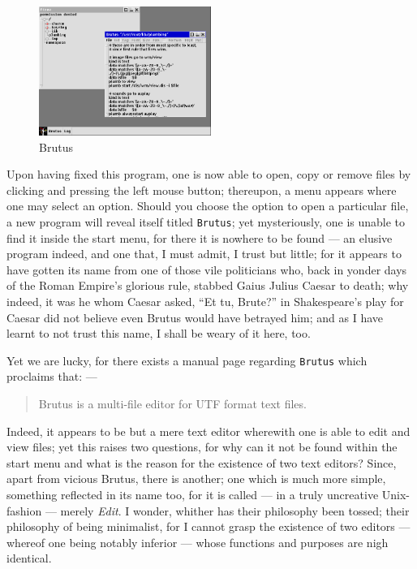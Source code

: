 \documentclass[a5paper,twoside,12pt]{report}
\begin{document}
  \begin{figure}
    \centering
    \includegraphics[width=0.5\textwidth]{imgs/brutus.png}
    \caption{Brutus}
  \end{figure}

  Upon having fixed this program, one is now able to open, copy or remove files by clicking and pressing the left mouse button; thereupon, a menu appears where one may select an option. Should you choose the option to open a particular file, a new program will reveal itself titled \texttt{Brutus}; yet mysteriously, one is unable to find it inside the start menu, for there it is nowhere to be found — an elusive program indeed, and one that, I must admit, I trust but little; for it appears to have gotten its name from one of those vile politicians who, back in yonder days of the Roman Empire's glorious rule, stabbed Gaius Julius Caesar to death; why indeed, it was he whom Caesar asked, ``Et tu, Brute?'' in Shakespeare's play for Caesar did not believe even Brutus would have betrayed him; and as I have learnt to not trust this name, I shall be weary of it here, too.
  
  Yet we are lucky, for there exists a manual page regarding \texttt{Brutus} which proclaims that: —

  \begin{quote}
    Brutus is a multi-file editor for UTF format text files.
  \end{quote}

  Indeed, it appears to be but a mere text editor wherewith one is able to edit and view files; yet this raises two questions, for why can it not be found within the start menu and what is the reason for the existence of two text editors? Since, apart from vicious Brutus, there is another; one which is much more simple, something reflected in its name too, for it is called — in a truly uncreative Unix-fashion — merely \textit{Edit}. I wonder, whither has their philosophy been tossed; their philosophy of being minimalist, for I cannot grasp the existence of two editors — whereof one being notably inferior — whose functions and purposes are nigh identical.
\end{document}
